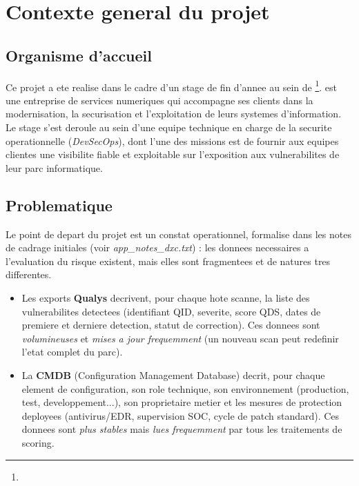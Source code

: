 \chapter{Contexte general du projet}
\label{chap:contexte}

\section{Organisme d'accueil}

Ce projet a ete realise dans le cadre d'un stage de fin d'annee au sein de
\organisme\footnote{}. \organisme{} est une entreprise de services numeriques qui
accompagne ses clients dans la modernisation, la securisation et l'exploitation de
leurs systemes d'information. Le stage s'est deroule au sein d'une equipe technique
en charge de la securite operationnelle (\emph{DevSecOps}), dont l'une des missions
est de fournir aux equipes clientes une visibilite fiable et exploitable sur
l'exposition aux vulnerabilites de leur parc informatique.

\section{Problematique}
\label{sec:problematique}

Le point de depart du projet est un constat operationnel, formalise dans les notes de
cadrage initiales (voir \emph{app\_notes\_dxc.txt}) : les donnees necessaires a
l'evaluation du risque existent, mais elles sont fragmentees et de natures tres
differentes.

\begin{itemize}
  \item Les exports \textbf{Qualys} decrivent, pour chaque hote scanne, la liste des
  vulnerabilites detectees (identifiant QID, severite, score QDS, dates de premiere
  et derniere detection, statut de correction). Ces donnees sont \emph{volumineuses}
  et \emph{mises a jour frequemment} (un nouveau scan peut redefinir l'etat complet
  du parc).
  \item La \textbf{CMDB} (Configuration Management Database) decrit, pour chaque
  element de configuration, son role technique, son environnement (production, test,
  developpement...), son proprietaire metier et les mesures de protection deployees
  (antivirus/EDR, supervision SOC, cycle de patch standard). Ces donnees sont
  \emph{plus stables} mais \emph{lues frequemment} par tous les traitements de
  scoring.
\end{itemize}


